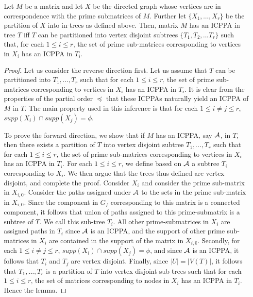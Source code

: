 \documentclass[MS]             %
              {iitmdiss_as}    %
\begin{document}
\begin{lemma}
  \label{lem:subicppa}
  Let $M$ be a matrix and let $X$ be the directed graph whose vertices
  are in correspondence with the prime submatrices of $M$.  Further
  let $\{X_1,\ldots,X_r\}$ be the partition of $X$ into in-trees as
  defined above.  Then, matrix $M$ has an ICPPA in tree $T$ iff $T$
  can be partitioned into vertex disjoint subtrees $\{T_1, T_2, \dots
  T_r\}$ such that, for each $1 \leq i \leq r$, the set of prime
  sub-matrices corresponding to vertices in $X_i$ has an ICPPA in
  $T_i$.
\end{lemma}
\begin{proof}
  Let us consider the reverse direction first.  Let us assume that $T$
  can be partitioned into $T_1, \ldots, T_r$ such that for each $1
  \leq i \leq r $, the set of prime sub-matrices corresponding to
  vertices in $X_i$ has an ICPPA in $T_i$.  It is clear from the
  properties of the partial order $\preccurlyeq$ that these ICPPAs
  naturally yield an ICPPA of $M$ in $T$.  The main property used in
  this inference is that for each $1 \leq i \neq j \leq r$, $supp(X_i)
  \cap supp(X_j) = \phi$.

\noindent
To prove the forward direction, we show that if $M$ has an ICPPA, say
${\cal A}$, in $T$, then there exists a partition of $T$ into vertex
disjoint subtree $T_1, \ldots, T_r$ such that for each $1 \leq i \leq
r$, the set of prime sub-matrices corresponding to vertices in $X_i$
has an ICPPA in $T_i$.  For each $1 \leq i \leq r$, we define based on
${\cal A}$ a subtree $T_i$ corresponding to $X_i$.  We then argue that the
trees thus defined are vertex disjoint, and complete the proof.
Consider $X_i$ and consider the prime sub-matrix in $X_{i,0}$.
Consider the paths assigned under ${\cal A}$ to the sets in the prime
sub-matrix in $X_{i,0}$.  Since the component in $G_f$ corresponding
to this matrix is a connected component, it follows that union of
paths assigned to this prime-submatrix is a subtree of $T$.  We call
this sub-tree $T_i$.  All other prime-submatrices in $X_i$ are
assigned paths in $T_i$ since ${\cal A}$ is an ICPPA, and the support of
other prime sub-matrices in $X_i$ are contained in the support of the
matrix in $X_{i,0}$.  Secondly, for each $1 \leq i \neq j \leq r$,
$supp(X_i) \cap supp(X_j) = \phi$, and since ${\cal A}$ is an ICPPA, it
follows that $T_i$ and $T_j$ are vertex disjoint.  Finally, since $|U|
= |V(T)|$, it follows that $T_1, \ldots, T_r$ is a partition of $T$
into vertex disjoint sub-trees such that for each $1 \leq i \leq r$,
the set of matrices corresponding to nodes in $X_i$ has an ICPPA in
$T_i$.  Hence the lemma.
\end{proof}
\end{document}
